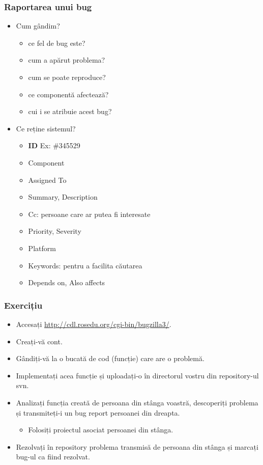 \documentclass{beamer}
\begin{document}
\begin{frame}
\frametitle{Raportarea unui bug}
\begin{itemize}
\item Cum gândim?
\begin{itemize}
\pause \item ce fel de bug este?
\pause \item cum a apărut problema?
\pause \item cum se poate reproduce?
\pause \item ce componentă afectează?
\pause \item cui i se atribuie acest bug? %
\end{itemize}
\pause \item Ce reține sistemul?
\begin{itemize}
\pause \item \textbf{ID} Ex: \#345529
\pause \item Component
\pause \item Assigned To
\pause \item Summary, Description
\pause \item Cc: persoane care ar putea fi interesate
\pause \item Priority, Severity
\pause \item Platform
\pause \item Keywords: pentru a facilita căutarea
\pause \item Depends on, Also affects
\end{itemize}
\end{itemize}
\end{frame}

\begin{frame}
\frametitle{Exercițiu}
\begin{itemize}
\pause \item Accesați \url{http://cdl.rosedu.org/cgi-bin/bugzilla3/}.
\pause \item Creați-vă cont.
\pause \item Gândiți-vă la o bucată de cod (funcție) care are o problemă.
\pause \item Implementați acea funcție și uploadați-o în directorul vostru din
repository-ul svn.
\pause \item Analizați funcția creată de persoana din stânga voastră, descoperiți
problema și transmiteți-i un bug report persoanei din dreapta.
\begin{itemize}
\item Folosiți proiectul asociat persoanei din stânga.
\end{itemize}
\pause \item Rezolvați în repository problema transmisă de persoana din stânga și marcați bug-ul ca fiind rezolvat.
\end{itemize}
\end{frame}
\end{document}
